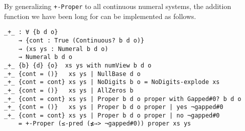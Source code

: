 \documentclass[\main/thesis.tex]{subfiles}
\begin{document}
By generalizing \lstinline|+-Proper| to all continuous numeral systems,
the addition function we have been long for can be implemented as follows.

\begin{lstlisting}[basicstyle=\ttfamily\scriptsize]
_+_ : ∀ {b d o}
    → {cont : True (Continuous? b d o)}
    → (xs ys : Numeral b d o)
    → Numeral b d o
_+_ {b} {d} {o}  xs ys with numView b d o
_+_ {cont = ()}   xs ys | NullBase d o
_+_ {cont = cont} xs ys | NoDigits b o = NoDigits-explode xs
_+_ {cont = ()}   xs ys | AllZeros b
_+_ {cont = cont} xs ys | Proper b d o proper with Gapped#0? b d o
_+_ {cont = ()}   xs ys | Proper b d o proper | yes ¬gapped#0
_+_ {cont = cont} xs ys | Proper b d o proper | no ¬gapped#0
    = +-Proper (≤-pred (≰⇒> ¬gapped#0)) proper xs ys
\end{lstlisting}
\end{document}
